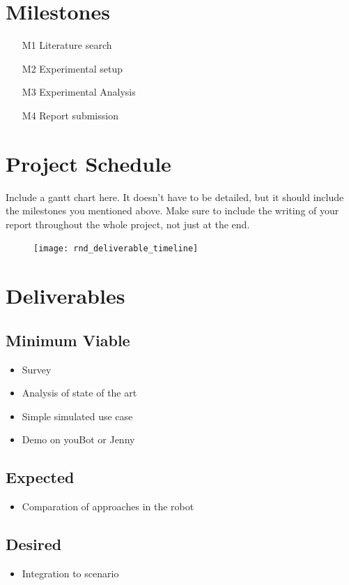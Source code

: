\documentclass[thesis]{mas_proposal}
\begin{document}
\section{Milestones}
\begin{enumerate}
    \item[M1] Literature search
    \item[M2] Experimental setup
    \item[M3] Experimental Analysis
    \item[M4] Report submission
\end{enumerate}

\section{Project Schedule}
Include a gantt chart here. It doesn't have to be detailed, but it should include the milestones you mentioned above.
Make sure to include the writing of your report throughout the whole project, not just at the end.

\begin{figure}[h!]
    \texttt{[image: rnd\_deliverable\_timeline]}
    \caption{}
    \label{}
\end{figure}

\section{Deliverables}
\subsection{Minimum Viable}

\begin{itemize}
    \item Survey
    \item Analysis of state of the art
    \item Simple simulated use case
    \item Demo on youBot or Jenny
\end{itemize}

\subsection{Expected}
\begin{itemize}
    \item Comparation of approaches in the robot
\end{itemize}

\subsection{Desired}
\begin{itemize}
    \item Integration to scenario
\end{itemize}


\nocite{*}

\end{document}
